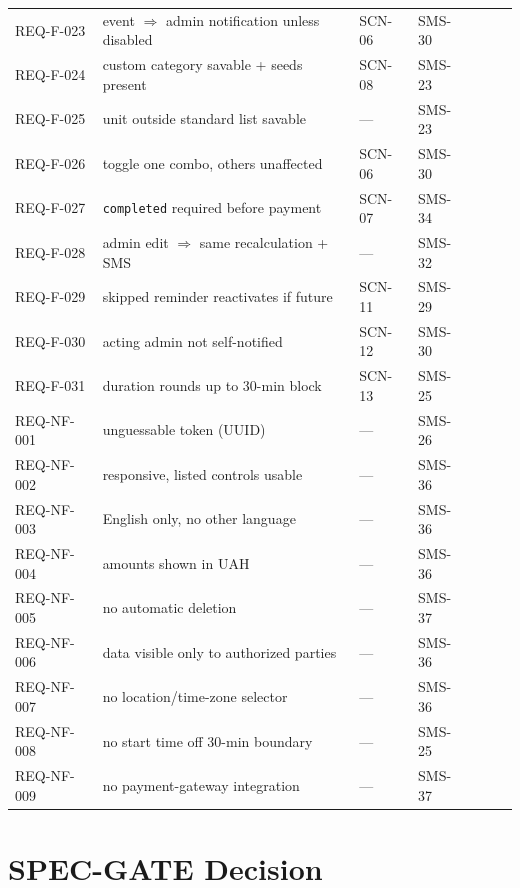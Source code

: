 \documentclass[11pt,a4paper]{article}
\begin{document}
\begin{longtable}{L{1.7cm}L{2.3cm}L{1.6cm}L{1.4cm}L{1.4cm}L{1.4cm}L{1.4cm}}
REQ-F-023 & event $\Rightarrow$ admin notification unless disabled & SCN-06 & SMS-30 & & & \\
REQ-F-024 & custom category savable + seeds present & SCN-08 & SMS-23 & & & \\
REQ-F-025 & unit outside standard list savable & --- & SMS-23 & & & \\
REQ-F-026 & toggle one combo, others unaffected & SCN-06 & SMS-30 & & & \\
REQ-F-027 & \texttt{completed} required before payment & SCN-07 & SMS-34 & & & \\
REQ-F-028 & admin edit $\Rightarrow$ same recalculation + SMS & --- & SMS-32 & & & \\
REQ-F-029 & skipped reminder reactivates if future & SCN-11 & SMS-29 & & & \\
REQ-F-030 & acting admin not self-notified & SCN-12 & SMS-30 & & & \\
REQ-F-031 & duration rounds up to 30-min block & SCN-13 & SMS-25 & & & \\
REQ-NF-001 & unguessable token (UUID) & --- & SMS-26 & & & \\
REQ-NF-002 & responsive, listed controls usable & --- & SMS-36 & & & \\
REQ-NF-003 & English only, no other language & --- & SMS-36 & & & \\
REQ-NF-004 & amounts shown in UAH & --- & SMS-36 & & & \\
REQ-NF-005 & no automatic deletion & --- & SMS-37 & & & \\
REQ-NF-006 & data visible only to authorized parties & --- & SMS-36 & & & \\
REQ-NF-007 & no location/time-zone selector & --- & SMS-36 & & & \\
REQ-NF-008 & no start time off 30-min boundary & --- & SMS-25 & & & \\
REQ-NF-009 & no payment-gateway integration & --- & SMS-37 & & & \\
\bottomrule
\end{longtable}

\section{SPEC-GATE Decision}
\label{sec:gate}
\end{document}
